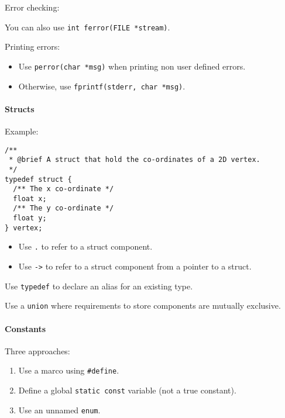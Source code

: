 \documentclass[twocolumn,english]{article}
\begin{document}
Error checking:

You can also use \texttt{int\ ferror(FILE\ *stream)}.

Printing errors:

\begin{itemize}

\item
  Use \texttt{perror(char\ *msg)} when printing non user defined errors.
\item
  Otherwise, use \texttt{fprintf(stderr,\ char\ *msg)}.
\end{itemize}

\paragraph{Structs}\label{structs}

Example:

\begin{verbatim}
/**
 * @brief A struct that hold the co-ordinates of a 2D vertex.
 */
typedef struct {
  /** The x co-ordinate */
  float x;
  /** The y co-ordinate */
  float y;
} vertex;
\end{verbatim}

\begin{itemize}

\item
  Use \texttt{.} to refer to a struct component.
\item
  Use \texttt{-\textgreater{}} to refer to a struct component from a
  pointer to a struct.
\end{itemize}

Use \texttt{typedef} to declare an alias for an existing type.

Use a \texttt{union} where requirements to store components are mutually
exclusive.

\paragraph{Constants}\label{constants}

Three approaches:

\begin{enumerate}
\def\labelenumi{\arabic{enumi}.}

\item
  Use a marco using \texttt{\#define}.
\item
  Define a global \texttt{static\ const} variable (not a true constant).
\item
  Use an unnamed \texttt{enum}.
\end{enumerate}
\end{document}
